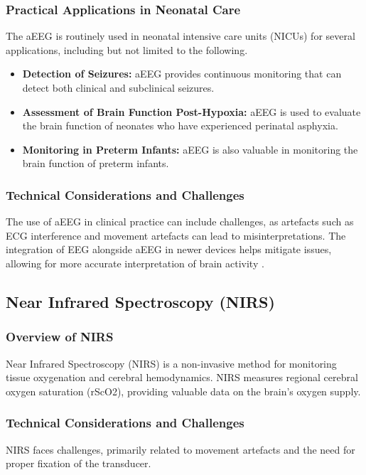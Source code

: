 \documentclass[12pt,journal,compsoc]{IEEEtran}
\begin{document}
\subsubsection{Practical Applications in Neonatal Care}
The aEEG is routinely used in neonatal intensive care units (NICUs) for several applications, including but not limited to the following. 

\begin{itemize}
    \item \textbf{Detection of Seizures:} aEEG provides continuous monitoring that can detect both clinical and subclinical seizures.  
    \item \textbf{Assessment of Brain Function Post-Hypoxia:} aEEG is used to evaluate the brain function of neonates who have experienced perinatal asphyxia.  
    \item \textbf{Monitoring in Preterm Infants:} aEEG is also valuable in monitoring the brain function of preterm infants.  
\end{itemize}

\subsubsection{Technical Considerations and Challenges}
The use of aEEG in clinical practice can include challenges, as artefacts such as ECG interference and movement artefacts can lead to misinterpretations. The integration of EEG alongside aEEG in newer devices helps mitigate issues, allowing for more accurate interpretation of brain activity \cite{IEEEhowto:toet}.

\subsection{Near Infrared Spectroscopy (NIRS)}

\subsubsection{Overview of NIRS}
Near Infrared Spectroscopy (NIRS) is a non-invasive method for monitoring tissue oxygenation and cerebral hemodynamics. NIRS measures regional cerebral oxygen saturation (rScO2), providing valuable data on the brain's oxygen supply. 

\subsubsection{Technical Considerations and Challenges}
NIRS faces challenges, primarily related to movement artefacts and the need for proper fixation of the transducer. 
\end{document}
